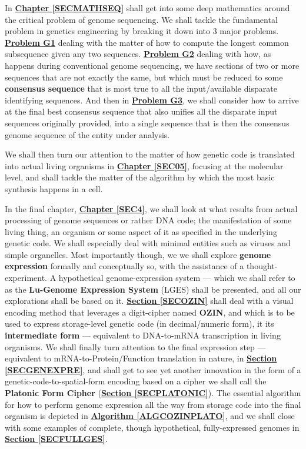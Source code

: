 \documentclass[a4paper, 18pt]{book} %
\begin{document}
In \textbf{\hyperref[SECMATHSEQ]{Chapter \ref{SECMATHSEQ}}} shall get into some deep mathematics around the critical problem of genome sequencing. We shall tackle the fundamental problem in genetics engineering by breaking it down into 3 major problems. \textbf{\hyperref[PROBG1]{Problem G1}} dealing with the matter of how to compute the longest common subsequence given any two sequences. \textbf{\hyperref[PROBG2]{Problem G2}} dealing with how, as happens during conventional genome sequencing, we have sections of two or more sequences that are not exactly the same, but which must be reduced to some \textbf{consensus sequence} that is most true to all the input/available disparate identifying sequences. And then in \textbf{\hyperref[SECCOMPGENSEQ]{Problem G3}}, we shall consider how to arrive at the final best consensus sequence that also unifies all the disparate input sequences originally provided, into a single sequence that is then the consensus genome sequence of the entity under analysis.


We shall then turn our attention to the matter of how genetic code is translated into actual living organisms in \textbf{\hyperref[SEC05]{Chapter \ref{SEC05}}}, focusing at the molecular level, and shall tackle the matter of the algorithm by which the most basic synthesis happens in a cell.


In the final chapter, \textbf{\hyperref[SEC4]{Chapter \ref{SEC4}}}, we shall look at what results from actual processing of genome sequences or rather DNA code; the manifestation of some living thing, an organism or some aspect of it as specified in the underlying genetic code. We shall especially deal with minimal entities such as viruses and simple organelles. Most importantly though, we we shall explore \textbf{genome expression} formally and conceptually so, with the assistance of a thought-experiment. A hypothetical genome-expression system --- which we shall refer to as the \textbf{Lu-Genome Expression System} (LGES) shall be presented, and all our explorations shall be based on it. \textbf{\hyperref[SECOZIN]{Section \ref{SECOZIN}}} shall deal with a visual encoding method that leverages a digit-cipher named \textbf{OZIN}, and which is to be used to express storage-level genetic code (in decimal/numeric form), it its \textbf{intermediate form} --- equivalent to DNA-to-mRNA transcription in living organisms. We shall finally turn attention to the final expression step --- equivalent to mRNA-to-Protein/Function translation in nature, in \textbf{\hyperref[SECGENEXPRE]{Section \ref{SECGENEXPRE}}}, and shall get to see yet another innovation in the form of a genetic-code-to-spatial-form encoding based on a cipher we shall call the \textbf{Platonic Form Cipher} (\textbf{\hyperref[SECPLATONIC]{Section \ref{SECPLATONIC}}}). The essential algorithm for how to perform genome expression all the way from storage code into the final organism is depicted in \textbf{\hyperref[ALGCOZINPLATO]{Algorithm \ref{ALGCOZINPLATO}}}, and we shall close with some examples of complete, though hypothetical, fully-expressed genomes in \textbf{\hyperref[SECFULLGES]{Section \ref{SECFULLGES}}}.
\end{document}
